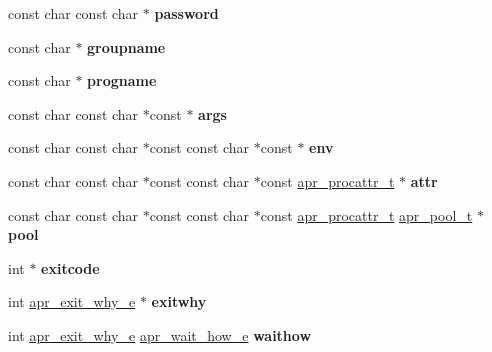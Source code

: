 \begin{DoxyCompactItemize}
const char const char $\ast$ {\bfseries password}
\item 
\mbox{\label{group__apr__thread__proc_ga401185bb13a6f4bfeccd15a40ff2efcd}} 
const char $\ast$ {\bfseries groupname}
\item 
\mbox{\label{group__apr__thread__proc_gad785d8a8f8ff378aa21eb1fa7a6085df}} 
const char $\ast$ {\bfseries progname}
\item 
\mbox{\label{group__apr__thread__proc_gab185e694a4eb4f843f733eaf264ab357}} 
const char const char $\ast$const  $\ast$ {\bfseries args}
\item 
\mbox{\label{group__apr__thread__proc_gaf265d8eb81b589ed808213bd43656deb}} 
const char const char $\ast$const const char $\ast$const  $\ast$ {\bfseries env}
\item 
\mbox{\label{group__apr__thread__proc_ga1f000a6f877b28975f25c365f0ffc5cc}} 
const char const char $\ast$const const char $\ast$const \mbox{\hyperlink{structapr__procattr__t}{apr\+\_\+procattr\+\_\+t}} $\ast$ {\bfseries attr}
\item 
\mbox{\label{group__apr__thread__proc_ga4d4955f2f41366cd4bc1761c8cbcff76}} 
const char const char $\ast$const const char $\ast$const \mbox{\hyperlink{structapr__procattr__t}{apr\+\_\+procattr\+\_\+t}} \mbox{\hyperlink{group__apr__pools_gaf137f28edcf9a086cd6bc36c20d7cdfb}{apr\+\_\+pool\+\_\+t}} $\ast$ {\bfseries pool}
\item 
\mbox{\label{group__apr__thread__proc_gae3500b4b917090c23a483eef038d3307}} 
int $\ast$ {\bfseries exitcode}
\item 
\mbox{\label{group__apr__thread__proc_ga723f20a59b9332ca01bcb7ab30da2457}} 
int \mbox{\hyperlink{group__apr__thread__proc_gac097b4fa41e67024711c5983446d0951}{apr\+\_\+exit\+\_\+why\+\_\+e}} $\ast$ {\bfseries exitwhy}
\item 
\mbox{\label{group__apr__thread__proc_gac365b1947e539c071abab05c84b9ff0f}} 
int \mbox{\hyperlink{group__apr__thread__proc_gac097b4fa41e67024711c5983446d0951}{apr\+\_\+exit\+\_\+why\+\_\+e}} \mbox{\hyperlink{group__apr__thread__proc_ga5e52d786644f3b66d6180571e68c7260}{apr\+\_\+wait\+\_\+how\+\_\+e}} {\bfseries waithow}

\end{DoxyCompactItemize}
